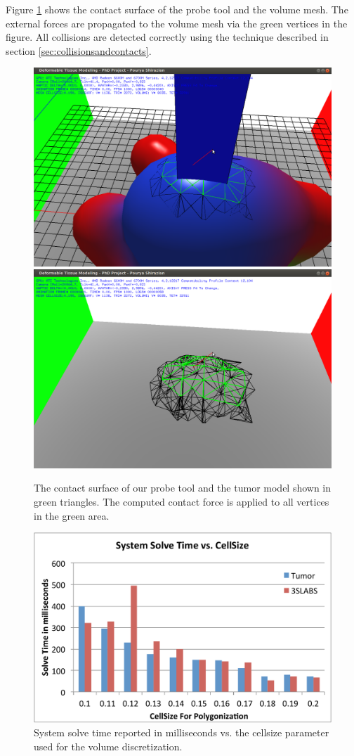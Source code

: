 Figure \ref{fig:1ring} shows the contact surface of the probe tool and the volume mesh. The external 
forces are propagated to the volume mesh via the green vertices in the figure. 
All collisions are detected correctly using the technique described in section 
\ref{sec:collisionsandcontacts}.

\begin{figure}[H]
  \centering
  \includegraphics[width=0.45\linewidth]{figures/deformable/shots/1ring01.png}
  \includegraphics[width=0.45\linewidth]{figures/deformable/shots/1ring03.png}
 
  \caption{\label{fig:1ring}
  {The contact surface of our probe tool and the tumor model shown in green triangles. The computed 
  contact force is applied to all vertices in the green area.}
}
\end{figure}

%

\begin{figure}[H]
  \centering
  \includegraphics[width=0.8\linewidth]{figures/deformable/systemsolvetime.pdf}
 
  \caption{\label{fig:syssolvetime}
  {System solve time reported in milliseconds vs. the cellsize parameter used for the volume discretization.}
}
\end{figure}

